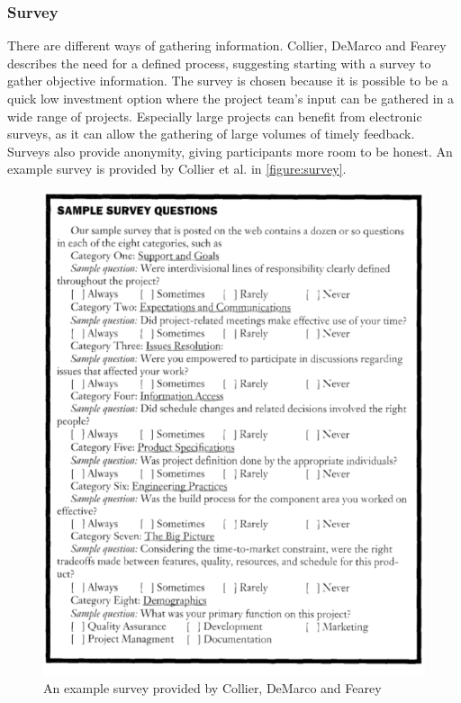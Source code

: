 \documentclass[12pt]{article}
\begin{document}
\subsubsection{Survey} There are different ways of gathering information. Collier, DeMarco and Fearey~\cite{Collier1996} describes the need for a defined process, suggesting starting with a survey to gather objective information. The survey is chosen because it is possible to be a quick low investment option where the project team's input can be gathered in a wide range of projects. Especially large projects can benefit from electronic surveys, as it can allow the gathering of large volumes of timely feedback. Surveys also provide anonymity, giving participants more room to be honest. An example survey is provided by Collier et al. in \autoref{figure:survey}.

\begin{figure}[h!]
	\centering
	\includegraphics[width=\textwidth]{figures/survey.png}
	\caption{An example survey provided by Collier, DeMarco and Fearey~\cite{Collier1996}}
	\label{figure:survey}
\end{figure}
\end{document}
